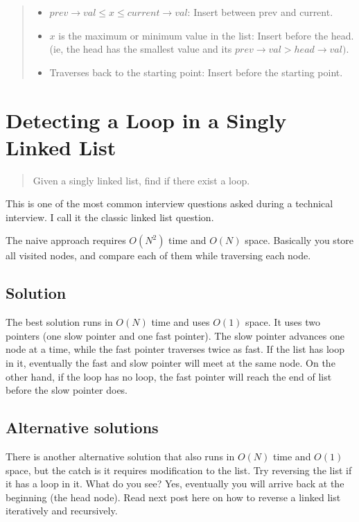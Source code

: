 \documentclass[12pt, reqno, oneside]{amsart}
\begin{document}
\begin{framed}
\begin{quotation}
\begin{itemize}
\item $prev \rightarrow val \leq x \leq current \rightarrow val$:
Insert between prev and current.
\item $x$ is the maximum or minimum value in the list:
Insert before the head. (ie, the head has the smallest value and its $prev \rightarrow val > head \rightarrow val)$.
\item 
Traverses back to the starting point:
Insert before the starting point.
\end{itemize}
\end{quotation}
\end{framed}




\section{Detecting a Loop in a Singly Linked List}

\begin{framed}
\begin{quotation}
Given a singly linked list, find if there exist a loop.
\end{quotation}
\end{framed}

This is one of the most common interview questions asked during a technical interview. I call it the classic linked list question.

The naive approach requires $O(N^2)$ time and $O(N)$ space. Basically you store all visited nodes, and compare each of them while traversing each node.

\subsection{Solution}
The best solution runs in $O(N)$ time and uses $O(1)$ space. It uses two pointers (one slow pointer and one fast pointer). The slow pointer advances one node at a time, while the fast pointer traverses twice as fast. If the list has loop in it, eventually the fast and slow pointer will meet at the same node. On the other hand, if the loop has no loop, the fast pointer will reach the end of list before the slow pointer does.



\subsection{Alternative solutions}
There is another alternative solution that also runs in $O(N)$ time and $O(1)$ space, but the catch is it requires modification to the list. Try reversing the list if it has a loop in it. What do you see? Yes, eventually you will arrive back at the beginning (the head node). Read next post here on how to reverse a linked list iteratively and recursively.
\end{document}
